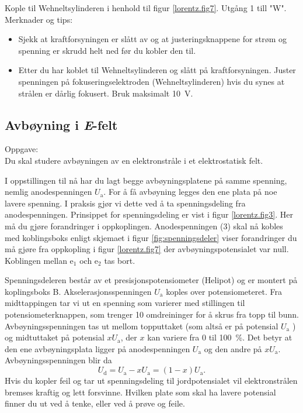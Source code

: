 \documentclass[../Elmag-labhefte-2020.tex]{subfiles}
\begin{document}
{\itsf Kople til Wehneltsylinderen i henhold til figur \ref{lorentz.fig7}.}
Utgång 1 till "W".
Merknader og tips:
\vspace{-4mm} 
\begin{itemize}
    \item Sjekk at kraftforsyningen er slått av og at justeringsknappene for strøm og spenning er skrudd helt ned før du kobler den til.
    \item Etter du har koblet til Wehneltsylinderen og slått på kraftforsyningen. Juster spenningen på fokuseringselektroden (Wehneltsylinderen) hvis du synes at strålen er dårlig fokusert. Bruk maksimalt \SI{10}{\volt}.
\end{itemize}
\newpage

\subsection{Avbøyning i \textsl{E}-felt}

Oppgave:\\
{\itsf Du skal studere avbøyningen av en elektronstråle i et elektrostatisk felt.}

I oppstillingen til nå har du lagt begge avbøyningsplatene på samme spenning, nemlig anodespenningen $U_\mathrm{a}$. For å få avbøyning legges den ene plata på noe lavere spenning. I praksis gjør vi dette ved å ta spenningsdeling fra anodespenningen. Prinsippet for spenningsdeling er vist i figur \ref{lorentz.fig3}. Her må du gjøre forandringer i oppkoplingen. Anodespenningen (3) skal nå kobles med koblingsboks enligt skjemaet i figur \ref{fig:spenningsdeler} viser forandringer du må gjøre fra oppkopling i figur \ref{lorentz.fig7} der avbøyningspotensialet var null. Koblingen mellan e$_1$ och e$_2$ tas bort. 


Spenningsdeleren består av et presisjonspotensiometer (Helipot) og er montert på koplingsboks B. Akselerasjonsspenningen $U_\mathrm{a}$ koples over potensiometeret. Fra midttappingen tar vi ut en spenning som varierer med stillingen til potensiometerknappen, som trenger 10 omdreininger for å skrus fra topp til bunn. Avbøyningsspenningen tas ut mellom topputtaket (som altså er på potensial $U_\mathrm{a}$ ) og midtuttaket på potensial $x  U_\mathrm{a}$, der $x$ kan variere fra 0 til \SI{100}{\percent}. Det betyr at den ene avbøyningsplata ligger på anodespenningen $U_\mathrm{a}$ og den andre på $x  U_\mathrm{a}$. Avbøyningsspenningen blir da 
\begin{equation}
    U_\mathrm{d} 
        = U_\mathrm{a} - x U_\mathrm{a} 
        = (1 - x) U_\mathrm{a}.
\end{equation}
Hvis du kopler feil og tar ut spenningsdeling til jordpotensialet vil elektronstrålen bremses kraftig og lett forsvinne. Hvilken plate som skal ha lavere potensial finner du ut ved å tenke, eller ved å prøve og feile.
\end{document}
